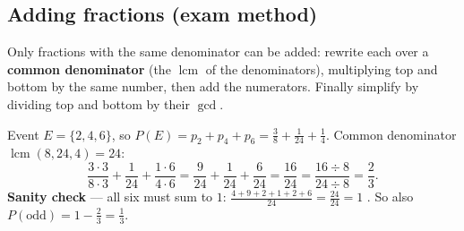 \documentclass{fkt-notes}
\theoremstyle{definition}
\begin{document}
\subsection{Adding fractions (exam method)}
Only fractions with the same denominator can be added: rewrite each
over a \textbf{common denominator} (the $\operatorname{lcm}$ of the
denominators), multiplying top and bottom by the same number, then add
the numerators. Finally simplify by dividing top and bottom by their
$\gcd$.

\begin{example}[Unfair die: $p_1 = \frac16$, $p_2 = \frac38$, $p_3 = \frac1{12}$,
    $p_4 = \frac1{24}$, $p_5 = \frac1{12}$, $p_6 = \frac14$; probability of an even number]
  Event $E = \{2, 4, 6\}$, so
  $P(E) = p_2 + p_4 + p_6 = \frac38 + \frac1{24} + \frac14$.
  Common denominator $\operatorname{lcm}(8, 24, 4) = 24$:
  \[
    \frac{3 \cdot 3}{8 \cdot 3} + \frac{1}{24} + \frac{1 \cdot 6}{4 \cdot 6}
    = \frac{9}{24} + \frac{1}{24} + \frac{6}{24}
    = \frac{16}{24}
    = \frac{16 \div 8}{24 \div 8}
    = \frac{2}{3}.
  \]
  \textbf{Sanity check} --- all six must sum to $1$:
  $\frac{4 + 9 + 2 + 1 + 2 + 6}{24} = \frac{24}{24} = 1$ \checkmark.
  So also $P(\text{odd}) = 1 - \frac23 = \frac13$.
\end{example}
\end{document}
